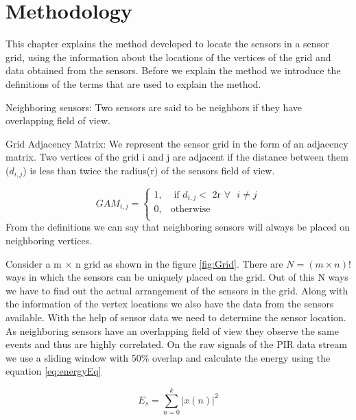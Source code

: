 \chapter{Methodology}

This chapter explains the method developed to locate the sensors in a sensor grid, using the information about the locations of the vertices of the grid and data obtained from the sensors. Before we explain the method we introduce the definitions of the terms that 
are used to explain the method.\\
\begin{definition}{Neighboring sensors:}
 Two sensors are said to be neighbors if they have overlapping field of view.
\end{definition}
\begin{definition}{Grid Adjacency Matrix:}
 We represent the sensor grid in the form of an adjacency matrix. Two vertices of the grid i and j are adjacent if the distance between them ($d_{i,j}$) is less than twice the radius(r) of the sensors field of view.

\[
GAM_{i,j} = 
\begin{cases}
1, &\text{ if } d_{i,j} < \text{  2r } \forall \text{ } i \ne j\\
0, & \text{otherwise}\\
\end{cases}
	\]
From the definitions we can say that neighboring sensors will always be placed on neighboring vertices. 
\end{definition}
Consider a m $\times$ n grid as shown in the figure \ref{fig:Grid}. There are $N= (m\times n)!$ ways in which the sensors can be uniquely placed on the grid. Out of this N ways we have to find out the actual arrangement of the sensors in the grid.  Along with the information of the vertex locations we also have the data from the sensors available. With the help of sensor data we need to determine the sensor location.\\
As neighboring sensors have an overlapping field of view they observe the same events and thus are highly correlated.
On the raw signals of the PIR data stream we use a sliding window with 50\% overlap and calculate the energy using the equation \ref{eq:energyEq}

\begin{equation}
\label{eq:energyEq}
E_s = {\sum_{n=0}^{k}{|x(n)|}^2}
\end{equation}

